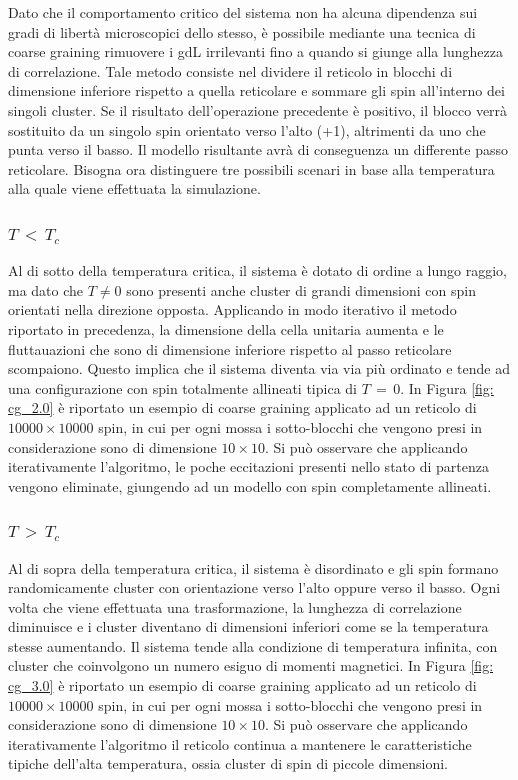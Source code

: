 Dato che il comportamento critico del sistema non ha alcuna dipendenza sui gradi di libertà microscopici dello stesso, è possibile mediante 
una tecnica di coarse graining rimuovere i gdL irrilevanti fino a quando si giunge alla lunghezza di correlazione. Tale metodo consiste 
nel dividere il reticolo in blocchi di dimensione inferiore rispetto a quella reticolare e sommare gli spin all'interno dei singoli cluster. 
Se il risultato dell'operazione precedente è positivo, il blocco verrà sostituito da un singolo spin orientato verso l'alto (+1), 
altrimenti da uno che punta verso il basso. Il modello risultante avrà di conseguenza un differente passo reticolare. Bisogna ora  
distinguere tre possibili scenari in base alla temperatura alla quale viene effettuata la simulazione.



\subsubsection{$T\,<\,T_c$}

Al di sotto della temperatura critica, il sistema è dotato di ordine a lungo raggio, ma dato che $T \neq 0$ sono presenti anche cluster 
di grandi dimensioni con spin orientati nella direzione opposta. Applicando in modo iterativo il metodo riportato in precedenza, la 
dimensione della cella unitaria aumenta e le fluttauazioni che sono di dimensione inferiore rispetto al passo reticolare scompaiono. 
Questo implica che il sistema diventa via via più ordinato e tende ad una configurazione con spin totalmente allineati tipica di 
$T\,=\,0$. In Figura \ref{fig: cg_2.0} è riportato un esempio di coarse graining applicato ad un reticolo di $10000 \times 10000$ 
spin, in cui per ogni mossa i sotto-blocchi che vengono presi in considerazione sono di dimensione $10 \times 10$. Si può osservare 
che applicando iterativamente l'algoritmo, le poche eccitazioni presenti nello stato di partenza vengono eliminate, giungendo ad un 
modello con spin completamente allineati. 



\subsubsection{$T\,>\,T_c$}

Al di sopra della temperatura critica, il sistema è disordinato e gli spin formano randomicamente cluster con orientazione verso 
l'alto oppure verso il basso. Ogni volta che viene effettuata una trasformazione, la lunghezza di correlazione diminuisce e i cluster 
diventano di dimensioni inferiori come se la temperatura stesse aumentando. Il sistema tende alla condizione di temperatura infinita, 
con cluster che coinvolgono un numero esiguo di momenti magnetici. In Figura \ref{fig: cg_3.0} è riportato un esempio di coarse graining 
applicato ad un reticolo di $10000 \times 10000$ spin, in cui per ogni mossa i sotto-blocchi che vengono presi in considerazione sono 
di dimensione $10 \times 10$. Si può osservare che applicando iterativamente l'algoritmo il reticolo continua a mantenere le caratteristiche 
tipiche dell'alta temperatura, ossia cluster di spin di piccole dimensioni.




